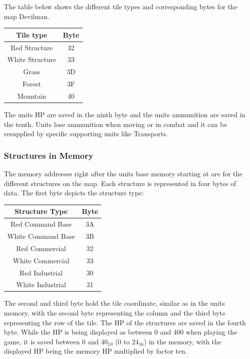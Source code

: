 The table below shows the different tile types and corresponding bytes for the map Devilman.

\begin{tabular}{|c|c|}
	\hline
	Tile type & Byte \\
	\hline
	Red Structure & 32 \\
	\hline
	White Structure & 33 \\
	\hline
	Grass & 3D \\
	\hline
	Forest & 3F \\
	\hline
	Mountain & 40  \\
	\hline
\end{tabular}

The units HP are saved in the ninth byte and the units ammunition are saved in the tenth. Units lose ammunition when moving or in combat and it can be resupplied by specific supporting units like Transports.

\subsubsection{Structures in Memory}
The memory addresses right after the units base memory starting at  are for the different structures on the map.
Each structure is represented in four bytes of data.
The first byte depicts the structure type:

\begin{tabular}{|c|c|}
	\hline
	Structure Type & Byte \\
	\hline
	Red Command Base & 3A \\
	\hline
	White Command Base & 3B \\
	\hline
	Red Commercial & 32 \\
	\hline
	White Commercial & 33 \\
	\hline
	Red Industrial & 30 \\
	\hline
	White Industrial & 31 \\
	\hline
\end{tabular}

The second and third byte hold the tile coordinate, similar as in the units memory, with the second byte representing the column and the third byte representing the row of the tile.
The HP of the structures are saved in the fourth byte.
While the HP is being displayed as between 0 and 400 when playing the game, it is saved between 0 and $40_{10}$ (0 to $24_{16}$) in the memory, with the displayed HP being the memory HP multiplied by factor ten.

